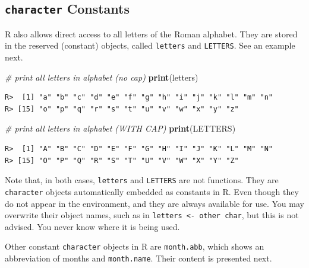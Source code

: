 \documentclass[
  12pt,
]{book}
\newenvironment{Shaded}{\begin{snugshade}}{\end{snugshade}}
\newcommand{\CommentTok}[1]{\textcolor[rgb]{0.37,0.37,0.37}{\textit{#1}}}
\newcommand{\KeywordTok}[1]{\textcolor[rgb]{0.27,0.27,0.27}{\textbf{#1}}}
\newcommand{\NormalTok}[1]{#1}
\begin{document}
\hypertarget{character-constants}{%
\subsection{\texorpdfstring{\texttt{character} Constants}{character Constants}}\label{character-constants}}

R also allows direct access to all letters of the Roman alphabet. They are stored in the reserved (constant) objects, called \texttt{letters} and \texttt{LETTERS}. See an example next.  

\begin{Shaded}
\begin{Highlighting}[]
\CommentTok{# print all letters in alphabet (no cap)}
\KeywordTok{print}\NormalTok{(letters)}
\end{Highlighting}
\end{Shaded}

\begin{verbatim}
R>  [1] "a" "b" "c" "d" "e" "f" "g" "h" "i" "j" "k" "l" "m" "n"
R> [15] "o" "p" "q" "r" "s" "t" "u" "v" "w" "x" "y" "z"
\end{verbatim}

\begin{Shaded}
\begin{Highlighting}[]
\CommentTok{# print all letters in alphabet (WITH CAP)}
\KeywordTok{print}\NormalTok{(LETTERS)}
\end{Highlighting}
\end{Shaded}

\begin{verbatim}
R>  [1] "A" "B" "C" "D" "E" "F" "G" "H" "I" "J" "K" "L" "M" "N"
R> [15] "O" "P" "Q" "R" "S" "T" "U" "V" "W" "X" "Y" "Z"
\end{verbatim}

Note that, in both cases, \texttt{letters} and \texttt{LETTERS} are not functions. They are \texttt{character} objects automatically embedded as constants in R. Even though they do not appear in the environment, and they are always available for use. You may overwrite their object names, such as in \texttt{letters\ \textless{}-\ \textquotesingle{}other\ char\textquotesingle{}}, but this is not advised. You never know where it is being used.

Other constant \texttt{character} objects in R are \texttt{month.abb}, which shows an abbreviation of months and \texttt{month.name}. Their content is presented next.    
\end{document}
